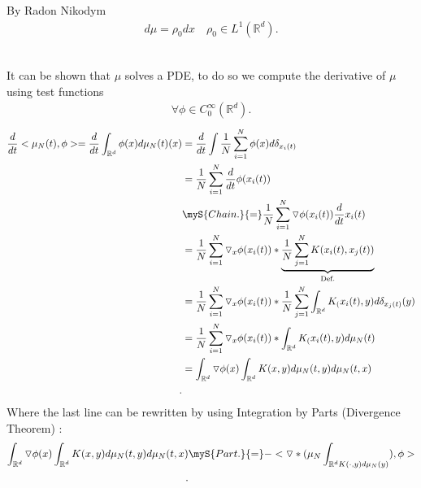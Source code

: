\begin{corollary}
  By Radon Nikodym 
 \begin{align*}
  d\mu  = \rho_0 dx \quad \rho_0 \in  L^{1}(\mathbb{R}^{d} ) 
 .\end{align*}
\end{corollary}
\hspace{0mm}\\
It can be shown that $\mu $ solves a PDE, to do so we compute the derivative of $\mu $ using test functions
\begin{align*}
  \forall \phi \in  C_0^{\infty}(\mathbb{R}^{d} ) 
.\end{align*}
\begin{align*}
  \frac{d}{dt} <\mu_{N}(t),\phi> = \frac{d}{dt} \int_{\mathbb{R}^{d} } \phi(x) d\mu_{N}(t)(x) &= \frac{d}{dt} \int \frac{1}{N} \sum_{i=1}^{N} \phi(x) d \delta_{x_i(t)} \\
                                                                                              &= \frac{1}{N} \sum_{i=1}^{N} \frac{d}{dt} \phi(x_i(t)) \\
                                                                                              &\myS{Chain.}{=} \frac{1}{N} \sum_{i=1}^{N}  \triangledown \phi(x_{i}(t)) \frac{d}{dt} x_i(t)\\
                                                                                              &= \frac{1}{N} \sum_{i=1}^{N} \triangledown_x \phi(x_i(t)) * \underbrace{\frac{1}{N} \sum_{j=1}^{N} K(x_i(t),x_j(t))}_{\text{Def.}}   \\
                                                                                              &=  \frac{1}{N} \sum_{i=1}^{N} \triangledown_x \phi(x_i(t))* \frac{1}{N} \sum_{j=1}^{N} \int_{\mathbb{R}^{d } }K_(x_i(t),y) d\delta_{x_j(t)}(y) \\
                                                                                              &=  \frac{1}{N} \sum_{i=1}^{N} \triangledown_x \phi(x_i(t))*  \int_{\mathbb{R}^{d } }K_(x_i(t),y) d\mu_{N}(t) \\
                                                                                              &= \int_{\mathbb{R}^{d} } \triangledown \phi(x) \int_{\mathbb{R}^{d } } K(x,y) d\mu_{N}(t,y) d\mu_N(t,x)  \\
.\end{align*}
Where the last line can be rewritten by using Integration by Parts (Divergence Theorem) :
\begin{align*}
  \int_{\mathbb{R}^{d} } \triangledown \phi(x) \int_{\mathbb{R}^{d } } K(x,y) d\mu_{N}(t,y) d\mu_N(t,x)  &\myS{Part.}{=} - <\triangledown*(\mu_N \int_{\mathbb{R}^{d } K(\cdot,y)d\mu_{N}(y)}),\phi> \\
.\end{align*}
